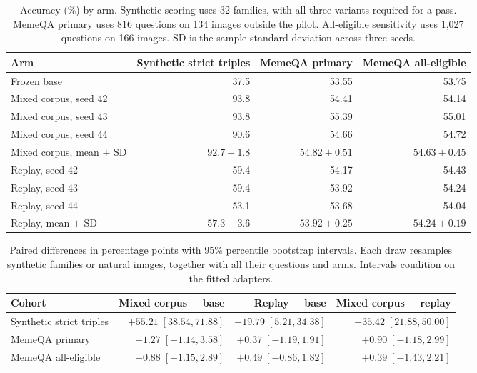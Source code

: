 \begin{table}[t]
\centering
\small
\begin{tabular}{@{}lrrr@{}}
\toprule
Arm & Synthetic strict triples & MemeQA primary & MemeQA all-eligible\\
\midrule
Frozen base & 37.5 & 53.55 & 53.75\\
\midrule
Mixed corpus, seed 42 & 93.8 & 54.41 & 54.14\\
Mixed corpus, seed 43 & 93.8 & 55.39 & 55.01\\
Mixed corpus, seed 44 & 90.6 & 54.66 & 54.72\\
Mixed corpus, mean $\pm$ SD & $92.7 \pm 1.8$ & $54.82 \pm 0.51$ & $54.63 \pm 0.45$\\
\midrule
Replay, seed 42 & 59.4 & 54.17 & 54.43\\
Replay, seed 43 & 59.4 & 53.92 & 54.24\\
Replay, seed 44 & 53.1 & 53.68 & 54.04\\
Replay, mean $\pm$ SD & $57.3 \pm 3.6$ & $53.92 \pm 0.25$ & $54.24 \pm 0.19$\\
\bottomrule
\end{tabular}
\caption{Accuracy (\%) by arm. Synthetic scoring uses 32 families, with all three variants required for a pass. MemeQA primary uses 816 questions on 134 images outside the pilot. All-eligible sensitivity uses 1{,}027 questions on 166 images. SD is the sample standard deviation across three seeds.}
\label{tab:full-scores}
\end{table}

\begin{table}[t]
\centering
\small
\begin{tabular}{@{}lrrr@{}}
\toprule
Cohort & Mixed corpus $-$ base & Replay $-$ base & Mixed corpus $-$ replay\\
\midrule
Synthetic strict triples & $+55.21\;[38.54, 71.88]$ & $+19.79\;[5.21, 34.38]$ & $+35.42\;[21.88, 50.00]$\\
MemeQA primary & $+1.27\;[{-}1.14, 3.58]$ & $+0.37\;[{-}1.19, 1.91]$ & $+0.90\;[{-}1.18, 2.99]$\\
MemeQA all-eligible & $+0.88\;[{-}1.15, 2.89]$ & $+0.49\;[{-}0.86, 1.82]$ & $+0.39\;[{-}1.43, 2.21]$\\
\bottomrule
\end{tabular}
\caption{Paired differences in percentage points with 95\% percentile bootstrap intervals. Each draw resamples synthetic families or natural images, together with all their questions and arms. Intervals condition on the fitted adapters.}
\label{tab:full-contrasts}
\end{table}
